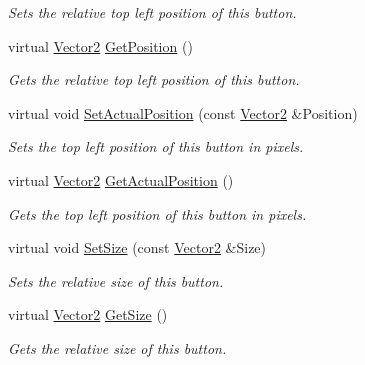 \begin{DoxyCompactItemize}
\begin{DoxyCompactList}\small\item\em Sets the relative top left position of this button. \item\end{DoxyCompactList}\item 
virtual \hyperlink{classphys_1_1Vector2}{Vector2} \hyperlink{classphys_1_1UI_1_1TextButton_a09768e0666a109b7d35fd8b78240cfd3}{GetPosition} ()
\begin{DoxyCompactList}\small\item\em Gets the relative top left position of this button. \item\end{DoxyCompactList}\item 
virtual void \hyperlink{classphys_1_1UI_1_1TextButton_aa82c174bba5db127a5a9977b9fdf1384}{SetActualPosition} (const \hyperlink{classphys_1_1Vector2}{Vector2} \&Position)
\begin{DoxyCompactList}\small\item\em Sets the top left position of this button in pixels. \item\end{DoxyCompactList}\item 
virtual \hyperlink{classphys_1_1Vector2}{Vector2} \hyperlink{classphys_1_1UI_1_1TextButton_ab406bec58bf6244c3e867fefd19d4d7f}{GetActualPosition} ()
\begin{DoxyCompactList}\small\item\em Gets the top left position of this button in pixels. \item\end{DoxyCompactList}\item 
virtual void \hyperlink{classphys_1_1UI_1_1TextButton_abceee9ffe1dd12e0e593a84f57d9b279}{SetSize} (const \hyperlink{classphys_1_1Vector2}{Vector2} \&Size)
\begin{DoxyCompactList}\small\item\em Sets the relative size of this button. \item\end{DoxyCompactList}\item 
virtual \hyperlink{classphys_1_1Vector2}{Vector2} \hyperlink{classphys_1_1UI_1_1TextButton_a21f1ff24070711e5a42eae4eb54d02d6}{GetSize} ()
\begin{DoxyCompactList}\small\item\em Gets the relative size of this button. \item\end{DoxyCompactList}\item 

\end{DoxyCompactItemize}
